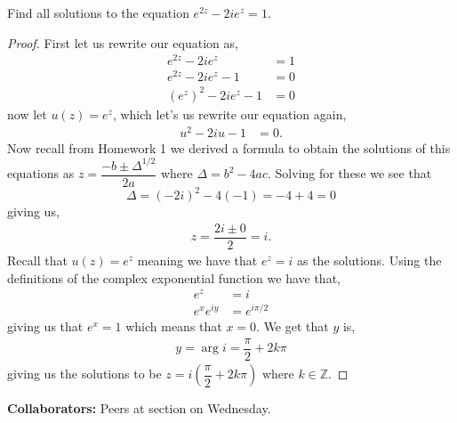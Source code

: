 \documentclass[11pt]{article}
\newenvironment{problem}[2][Problem\!]{\begin{trivlist}
\item[\hskip \labelsep {\bfseries #1}\hskip \labelsep {\bfseries #2}]}{\end{trivlist}}
\newcommand{\zz}{\mathbb Z}   %
\newcommand{\lrp}[1]{\left(#1\right)}
\begin{document}
\begin{problem}{4.5}
Find all solutions to the equation $e^{2z} - 2ie^z = 1$.
\end{problem}
\begin{proof}
  First let us rewrite our equation as,
  \begin{align*}
    e^{2z} -2ie^{z} &= 1 \\
    e^{2z} -2ie^{z} -1 &= 0 \\
    (e^{z})^{2} -2ie^{z} - 1 &=0
  \end{align*}
  now let $u(z) = e^{z}$, which let's us rewrite our equation again,
  \begin{align*}
    u^{2} -2i u -1 &= 0. 
  \end{align*}
  Now recall from Homework 1 we derived a formula to obtain the solutions of this equations as $z = \dfrac{-b \pm \Delta^{1/2}}{2a}$ where $\Delta = b^{2} - 4ac$. Solving for these we see that 
  \[\Delta = (-2i)^{2} -4(-1) = -4 + 4 = 0\]
  giving us,
  \begin{align*}
    z = \dfrac{2i \pm 0}{2} = i.
  \end{align*}
  Recall that $u(z) = e^{z}$ meaning we have that $e^{z} = i$ as the solutions. Using the definitions of the complex exponential function we have that,
  \begin{align*}
    e^{z} &= i \\
    e^{x}e^{i y} &= e^{i\pi/2}
  \end{align*}
  giving us that $e^{x} = 1$ which means that $x = 0$. We get that $y$ is,
  \begin{align*}
    y = \arg i = \dfrac{\pi}{2} + 2k\pi
  \end{align*}
  giving us the solutions to be $z = i\lrp{\dfrac{\pi}{2} +2k\pi}$ where $k \in \zz$.

\end{proof}


\newpage



\begin{center}
\textbf{Collaborators:}
Peers at section on Wednesday. 
\end{center}
\vfill 


\end{document}

